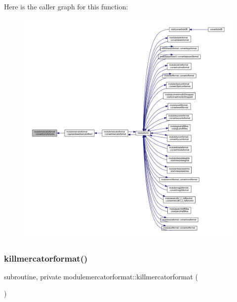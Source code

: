 Here is the caller graph for this function\+:\nopagebreak
\begin{figure}[H]
\begin{center}
\leavevmode
\includegraphics[width=350pt]{namespacemodulemercatorformat_afe587bb63f0975739ea6aae4c3ce6a6f_icgraph}
\end{center}
\end{figure}
\mbox{\label{namespacemodulemercatorformat_a33fe8f1a366fc933cb9debc1dcc3debe}} 
\subsubsection{\texorpdfstring{killmercatorformat()}{killmercatorformat()}}
{\footnotesize\ttfamily subroutine, private modulemercatorformat\+::killmercatorformat (\begin{DoxyParamCaption}{ }\end{DoxyParamCaption})\hspace{0.3cm}{\ttfamily [private]}}

